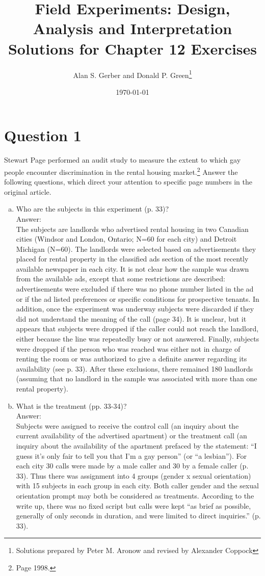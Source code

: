 \documentclass[11pt,notitlepage]{article}\usepackage[]{graphicx}\usepackage[]{color}
\title{Field Experiments: Design, Analysis and Interpretation \\
Solutions for Chapter 12 Exercises}
\author{Alan S. Gerber and Donald P. Green\footnote{Solutions prepared by Peter M. Aronow and revised by Alexander Coppock}}
\date{\today}
\begin{document}
\maketitle


\section*{Question 1}
Stewart Page performed an audit study to measure the extent to which gay people encounter discrimination in the rental housing market.\footnote{Page 1998.} Answer the following questions, which direct your attention to specific page numbers in the original article.

\begin{enumerate}[a)]
\item Who are the subjects in this experiment (p. 33)?\\
Answer:\\
The subjects are landlords who advertised rental housing in two Canadian cities (Windsor and London, Ontario; N=60 for each city) and Detroit Michigan (N=60). The landlords were selected based on advertisements they placed for rental property in the classified ads section of the most recently available newspaper in each city. It is not clear how the sample was drawn from the available ads, except that some restrictions are described: advertisements were excluded if there was no phone number listed in the ad or if the ad listed preferences or specific conditions for prospective tenants. In addition, once the experiment was underway subjects were discarded if they did not understand the meaning of the call (page 34). It is unclear, but it appears that subjects were dropped if the caller could not reach the landlord, either because the line was repeatedly busy or not answered. Finally, subjects were dropped if the person who was reached was either not in charge of renting the room or was authorized to give a definite answer regarding its availability (see p. 33). After these exclusions, there remained 180 landlords (assuming that no landlord in the sample was associated with more than one rental property). 

\item What is the treatment (pp. 33-34)?\\
Answer:\\
Subjects were assigned to receive the control call (an inquiry about the current availability of the advertised apartment) or the treatment call (an inquiry about the availability of the apartment prefaced by the statement: ``I guess it's only fair to tell you that I'm a gay person'' (or ``a lesbian''). For each city 30 calls were made by a male caller and 30 by a female caller (p. 33). Thus there was assignment into 4 groups (gender x sexual orientation) with 15 subjects in each group in each city. Both caller gender and the sexual orientation prompt may both be considered as treatments. According to the write up, there was no fixed script but calls were kept ``as brief as possible, generally of only seconds in duration, and were limited to direct inquiries.'' (p. 33).   


\end{enumerate}
\end{document}
